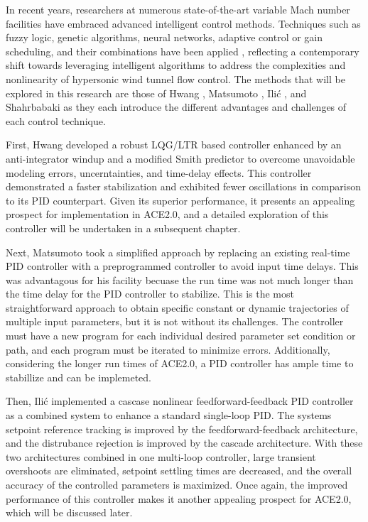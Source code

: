 In recent years, researchers at numerous state-of-the-art variable Mach number facilities have embraced advanced intelligent control methods. Techniques such as fuzzy logic, genetic algorithms, neural networks, adaptive control or gain scheduling, and their combinations have been applied \cite{nott,shahrbabaki-1}, reflecting a contemporary shift towards leveraging intelligent algorithms to address the complexities and nonlinearity of hypersonic wind tunnel flow control. The methods that will be explored in this research are those of Hwang \cite{hwang}, Matsumoto \cite{matsumoto}, Ili\'c \cite{ilic-2}, and Shahrbabaki \cite{shahrbabaki-1} as they each introduce the different advantages and challenges of each control technique. 

First, Hwang developed a robust LQG/LTR based controller enhanced by an anti-integrator windup and a modified Smith predictor to overcome unavoidable modeling errors, uncerntainties, and time-delay effects. This controller demonstrated a faster stabilization and exhibited fewer oscillations in comparison to its PID counterpart. Given its superior performance, it presents an appealing prospect for implementation in ACE2.0, and a detailed exploration of this controller will be undertaken in a subsequent chapter.

Next, Matsumoto took a simplified approach by replacing an existing real-time PID controller with a preprogrammed controller to avoid input time delays. This was advantagous for his facility becuase the run time was not much longer than the time delay for the PID controller to stabilize. This is the most straightforward approach to obtain specific constant or dynamic trajectories of multiple input parameters, but it is not without its challenges. The controller must have a new program for each individual desired parameter set condition or path, and each program must be iterated to minimize errors. Additionally, considering the longer run times of ACE2.0, a PID controller has ample time to stabillize and can be implemeted. 

Then, Ili\'c implemented a cascase nonlinear feedforward-feedback PID controller as a combined system to enhance a standard single-loop PID. The systems setpoint reference tracking is improved by the feedforward-feedback architecture, and the distrubance rejection is improved by the cascade architecture. With these two architectures combined in one multi-loop controller, large transient overshoots are eliminated, setpoint settling times are decreased, and the overall accuracy of the controlled parameters is maximized. Once again, the improved performance of this controller makes it another appealing prospect for ACE2.0, which will be discussed later.


